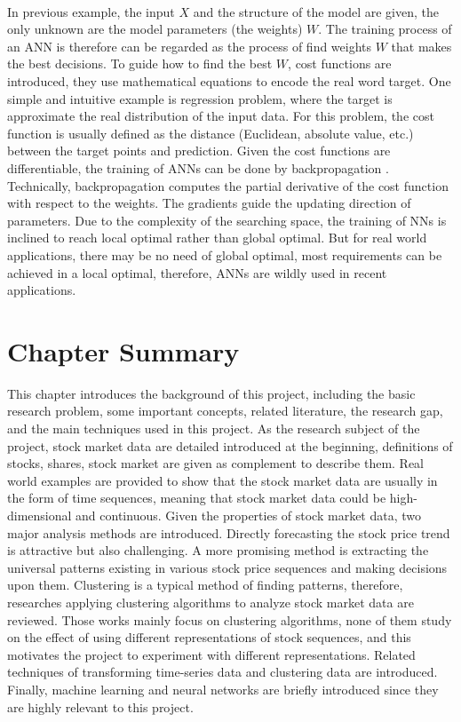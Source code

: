 \\In previous example, the input $X$ and the structure of the model are given, the only unknown are the model parameters (the weights) $W$. The training process of an ANN is therefore can be regarded as the process of find weights $W$ that makes the best decisions. To guide how to find the best $W$, cost functions are introduced, they use mathematical equations to encode the real word target. One simple and intuitive example is regression problem, where the target is approximate the real distribution of the input data. For this problem, the cost function is usually defined as the distance (Euclidean, absolute value, etc.) between the target points and prediction. Given the cost functions are differentiable, the training of ANNs can be done by backpropagation \cite{rojas2013neural}. Technically, backpropagation computes the partial derivative of the cost function with respect to the weights. The gradients guide the updating direction of parameters. Due to the complexity of the searching space, the training of NNs is inclined to reach local optimal rather than global optimal. But for real world applications, there may be no need of global optimal, most requirements can be achieved in a local optimal, therefore, ANNs are wildly used in recent applications.

\section{Chapter Summary}
This chapter introduces the background of this project, including the basic research problem, some important concepts, related literature, the research gap, and the main techniques used in this project. As the research subject of the project, stock market data are detailed introduced at the beginning, definitions of stocks, shares, stock market are given as complement to describe them. Real world examples are provided to show that the stock market data are usually in the form of time sequences, meaning that stock market data could be high-dimensional and continuous. Given the properties of stock market data, two major analysis methods are introduced. Directly forecasting the stock price trend is attractive but also challenging. A more promising method is extracting the universal patterns existing in various stock price sequences and making decisions upon them. Clustering is a typical method of finding patterns, therefore, researches applying clustering algorithms to analyze stock market data are reviewed. Those works mainly focus on clustering algorithms, none of them study on the effect of using different representations of stock sequences, and this motivates the project to experiment with different representations. Related techniques of transforming time-series data and clustering data are introduced. Finally, machine learning and neural networks are briefly introduced since they are highly relevant to this project.